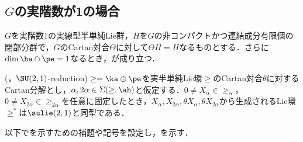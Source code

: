 \subsection{$ G$の実階数が1の場合}

\begin{thm}\label{thm:1216-main}
  $G$を実階数1の実線型半単純Lie群，$H$を$G$の非コンパクトかつ連結成分有限個の閉部分群で，$G$のCartan対合$\Theta$に対して$\Theta H = H$なるものとする．さらに$\dim \ha\cap\pe = 1$なるとき，が成り立つ．
\end{thm}

\begin{thm}\label{thm:0810}(\cite[p.~409, Theorem~3.1]{hel01}，$\SU(2,1) $-reduction)
  $\ge = \ka \oplus \pe$を実半単純Lie環$\ge$のCartan対合$\theta$に対する Cartan分解とし，$\alpha,2\alpha\in \Sigma(\ge,\ah) $と仮定する．$0\neq X_{\alpha}\in \ge_{\alpha} $，$0\neq X_{2\alpha}\in \ge_{2\alpha} $を任意に固定したとき，$X_{\alpha},X_{2\alpha}, \theta X_{\alpha}, \theta X_{2\alpha} $から生成されるLie環$\ge^{*} $は$\sulie(2,1)$と同型である．
  
\end{thm}
以下でを示すための補題や記号を設定し，を示す．
